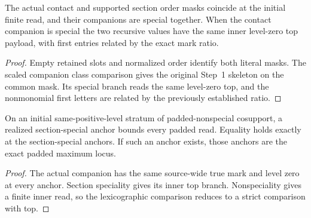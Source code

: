 \begin{theorem}
\label{hir:g1-initial-companion-section-special-transfer}
\leanok
The actual contact and supported section order masks coincide
at the initial finite read, and their companions are special
together. When the contact companion is special the two
recursive values have the same inner level-zero top payload,
with first entries related by the exact mark ratio.
\end{theorem}
\begin{proof}
Empty retained slots and normalized order identify both literal
masks. The scaled companion class comparison gives the original
Step~1 skeleton on the common mask. Its special branch reads
the same level-zero top, and the nonmonomial first letters are
related by the previously established ratio.
\end{proof}

\begin{theorem}
\label{hir:g1-initial-positive-mixed-stratum}
\leanok
On an initial same-positive-level stratum of padded-nonspecial
cosupport, a realized section-special anchor bounds every
padded read. Equality holds exactly at the section-special
anchors. If such an anchor exists, those anchors are the exact
padded maximum locus.
\end{theorem}
\begin{proof}
The actual companion has the same source-wide true mark and
level zero at every anchor. Section speciality gives its inner
top branch. Nonspeciality gives a finite inner read, so the
lexicographic comparison reduces to a strict comparison with top.
\end{proof}

